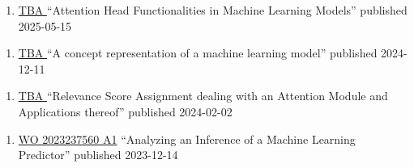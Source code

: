 
\newcommand{\patentref}[5]{\href{#4}{#1 #2} ``#3'' \hfill granted #5}
\newcommand{\patentpubref}[5]{\href{#4}{#1 #2} ``#3'' \hfill published #5}



{
    \ifdefined\shortcv
        {}
    \else
        {
            \begin{enumerate}
                \item [] \patentpubref{TBA}
                                        {}
                                        {Attention Head Functionalities in Machine Learning Models}
                                        {}
                                        {2025-05-15}
            \end{enumerate}
        }
    \fi
}



{
    \ifdefined\shortcv
        {}
    \else
        {
            \begin{enumerate}
                \item [] \patentpubref{TBA}
                                        {}
                                        {A concept representation of a machine learning model}
                                        {}
                                        {2024-12-11}
            \end{enumerate}
        }
    \fi
}




{
    \ifdefined\shortcv
        {}
    \else
        {
            \begin{enumerate}
                \item [] \patentpubref{TBA}
                                        {}
                                        {Relevance Score Assignment dealing with an Attention Module and Applications thereof}
                                        {}
                                        {2024-02-02}
            \end{enumerate}
        }
    \fi
}




{
    \ifdefined\shortcv
        {}
    \else
        {
            \begin{enumerate}
                \item [] \patentpubref{WO}
                                        {2023237560 A1}
                                        {Analyzing an Inference of a Machine Learning Predictor}
                                        {https://patentimages.storage.googleapis.com/3d/6c/b6/935e952fe109fa/WO2023237560A1.pdf}
                                        {2023-12-14}
            \end{enumerate}
        }
    \fi
}

